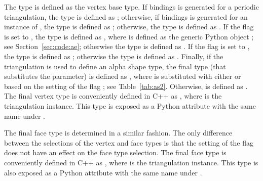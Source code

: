 The type  is defined as the vertex base type.  If
bindings is generated for a periodic triangulation, the type
 is defined as
;
otherwise, if bindings is generated for an instance of
, the
type  is defined as
;
otherwise, the type  is defined as
.
%
If the \cmake{} flag  is set
to , the type  is defined as
, where  is defined as the generic Python
object ; see Section~\ref{sec:code:ae};
otherwise the type  is defined as .
%
If the \cmake{} flag  is set
to , the type  is defined as
; otherwise
the type  is defined as .
%
Finally, if the triangulation is used to define an alpha shape type,
the final type  (that substitutes the
 parameter) is defined as
, where  is
substituted with either  or 
based on the setting of the \cmake{} flag
; see
Table~\ref{tab:as2}. Otherwise,  is defined as
.
%
The final vertex type is conveniently defined in C++ as
, where  is the
triangulation instance. This type is exposed as a Python attribute
with the same name under .

The final face type is determined in a similar fashion. The only
difference between the selections of the vertex and face types is that
the setting of the \cmake{} flag  does
not have an effect on the face type selection. The final face type is
conveniently defined in C++ as , where
 is the triangulation instance. This type is also
exposed as a Python attribute with the same name under
.

